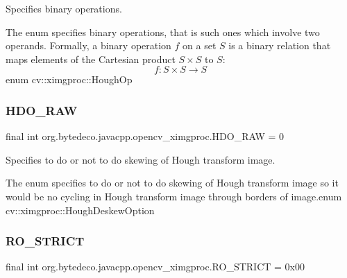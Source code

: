 Specifies binary operations. 

The enum specifies binary operations, that is such ones which involve two operands. Formally, a binary operation $ f $ on a set $ S $ is a binary relation that maps elements of the Cartesian product $ S \times S $ to $ S $\+: \[ f: S \times S \to S \]enum cv\+::ximgproc\+::\+Hough\+Op \mbox{\label{classorg_1_1bytedeco_1_1javacpp_1_1opencv__ximgproc_af143ef22057c2fb15ae3cf5d6c55e484}} 
\subsubsection{\texorpdfstring{H\+D\+O\+\_\+\+R\+AW}{HDO\_RAW}}
{\footnotesize\ttfamily final int org.\+bytedeco.\+javacpp.\+opencv\+\_\+ximgproc.\+H\+D\+O\+\_\+\+R\+AW = 0\hspace{0.3cm}{\ttfamily [static]}}



Specifies to do or not to do skewing of Hough transform image. 

The enum specifies to do or not to do skewing of Hough transform image so it would be no cycling in Hough transform image through borders of image.\+enum cv\+::ximgproc\+::\+Hough\+Deskew\+Option \mbox{\label{classorg_1_1bytedeco_1_1javacpp_1_1opencv__ximgproc_a672ff08a885adecc6dfdab8968e4c369}} 
\subsubsection{\texorpdfstring{R\+O\+\_\+\+S\+T\+R\+I\+CT}{RO\_STRICT}}
{\footnotesize\ttfamily final int org.\+bytedeco.\+javacpp.\+opencv\+\_\+ximgproc.\+R\+O\+\_\+\+S\+T\+R\+I\+CT = 0x00\hspace{0.3cm}{\ttfamily [static]}}



